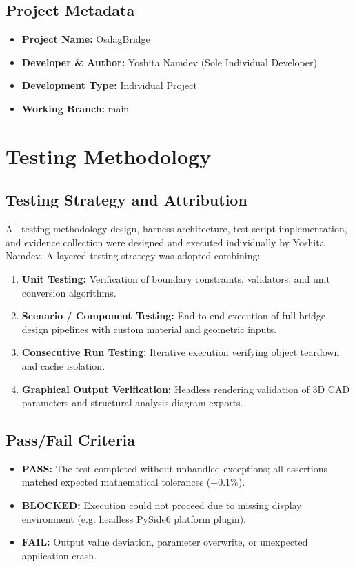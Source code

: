 \documentclass[11pt,a4paper]{report}
\begin{document}
\section{Project Metadata}
\begin{itemize}
    \item \textbf{Project Name:} OsdagBridge
    \item \textbf{Developer \& Author:} Yoshita Namdev (Sole Individual Developer)
    \item \textbf{Development Type:} Individual Project
    \item \textbf{Working Branch:} main
\end{itemize}

\chapter{Testing Methodology}
\section{Testing Strategy and Attribution}
All testing methodology design, harness architecture, test script implementation, and evidence collection were designed and executed individually by Yoshita Namdev. A layered testing strategy was adopted combining:
\begin{enumerate}
    \item \textbf{Unit Testing:} Verification of boundary constraints, validators, and unit conversion algorithms.
    \item \textbf{Scenario / Component Testing:} End-to-end execution of full bridge design pipelines with custom material and geometric inputs.
    \item \textbf{Consecutive Run Testing:} Iterative execution verifying object teardown and cache isolation.
    \item \textbf{Graphical Output Verification:} Headless rendering validation of 3D CAD parameters and structural analysis diagram exports.
\end{enumerate}

\section{Pass/Fail Criteria}
\begin{itemize}
    \item \textbf{PASS:} The test completed without unhandled exceptions; all assertions matched expected mathematical tolerances ($\pm 0.1\%$).
    \item \textbf{BLOCKED:} Execution could not proceed due to missing display environment (e.g. headless PySide6 platform plugin).
    \item \textbf{FAIL:} Output value deviation, parameter overwrite, or unexpected application crash.
\end{itemize}
\end{document}
